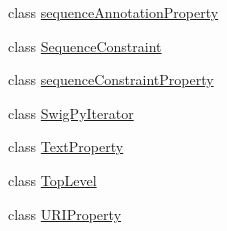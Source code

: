 \begin{DoxyCompactItemize}
\item 
class \hyperlink{classsbol_1_1libsbol_1_1sequence_annotation_property}{sequence\+Annotation\+Property}
\item 
class \hyperlink{classsbol_1_1libsbol_1_1_sequence_constraint}{Sequence\+Constraint}
\item 
class \hyperlink{classsbol_1_1libsbol_1_1sequence_constraint_property}{sequence\+Constraint\+Property}
\item 
class \hyperlink{classsbol_1_1libsbol_1_1_swig_py_iterator}{Swig\+Py\+Iterator}
\item 
class \hyperlink{classsbol_1_1libsbol_1_1_text_property}{Text\+Property}
\item 
class \hyperlink{classsbol_1_1libsbol_1_1_top_level}{Top\+Level}
\item 
class \hyperlink{classsbol_1_1libsbol_1_1_u_r_i_property}{U\+R\+I\+Property}
\end{DoxyCompactItemize}
